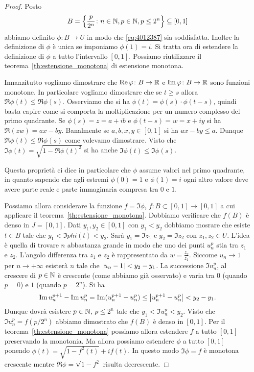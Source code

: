 \begin{proof}
Posto 
\[
B = {\left\{ \frac{p}{2^n}\colon n\in {\mathbb N}, p\in {\mathbb N}, p\le 2^n \right\}} \subseteq [0,1]
\]
abbiamo definito $\phi\colon B\to U$ in modo che \eqref{eq:4012387}
sia soddisfatta. 
Inoltre la definizione di $\phi$ è unica se imponiamo  
$\phi(1)=i$.
Si tratta ora di estendere la definizione di $\phi$ a tutto 
l'intervallo $[0,1]$. 
Possiamo riutilizzare il teorema~\ref{th:estensione_monotona} di 
estensione monotona.

Innanzitutto vogliamo dimostrare che $\operatorname{Re} \varphi\colon B\to {\mathbb R}$ 
e $\operatorname{Im} \varphi\colon B\to {\mathbb R}$ sono funzioni monotone.
In particolare vogliamo dimostrare che se $t\ge s$ allora 
$\Re \phi(t) \le \Re \phi(s)$.
Osserviamo che si ha $\phi(t) = \phi(s)\cdot \phi(t-s)$, 
quindi basta capire come si comporta la moltiplicazione per un 
numero complesso del primo quadrante.
Se $\phi(s)=z=a+ib$ e $\phi(t-s)=w=x+iy$ si ha
$\Re (zw) = ax-by$. Banalmente se $a,b,x,y\in[0,1]$ si ha 
$ax-by \le a$. 
Dunque $\Re \phi(t)\le \Re \phi(s)$ come volevamo dimostrare.
Visto che $\Im \phi(t) = \sqrt{1-\Re \phi(t)^2}$ si ha
anche $\Im \phi(t) \le \Im \phi(s)$.

Questa proprietà ci dice in particolare che $\phi$ assume valori 
nel primo quadrante, in quanto sapendo che agli estremi 
$\phi(0) = 1$ 
e $\phi(1)=i$ ogni altro valore deve avere parte reale 
e parte immaginaria compresa tra $0$ e $1$.

Possiamo allora considerare la funzione 
$f=\Im \phi$, $f\colon B\subset [0,1]\to[0,1]$
a cui applicare il teorema~\ref{th:estensione_monotona}.
Dobbiamo verificare che $f(B)$ è denso in $J=[0,1]$. 
Dati $y_1,y_2\in [0,1]$ con $y_1<y_2$ dobbiamo mosrare che esiste $t\in B$ tale 
che $y_1 < \Im phi(t) < y_2$.
Sarà $y_1=\Im z_1$ e $y_2=\Im z_2$ con $z_1,z_2\in U$.
L'idea è quella di trovare $n$ abbastanza grande in modo che uno dei punti 
$u_n^p$ stia tra $z_1$ e $z_2$. 
L'angolo differenza tra $z_1$ e $z_2$ è rappresentato da 
$w=\frac{z_2}{z_1}$. 
Siccome $u_n\to 1$ per $n\to +\infty$ 
esisterà $n$ tale che ${\left|u_n-1\right|}<y_2-y_1$.
La successione $\Im u_n^p$, al crescere di $p\in {\mathbb N}$ è crescente 
(come abbiamo già osservato) e varia tra $0$ (quando $p=0$) e $1$ 
(quando $p=2^n$). 
Si ha
\[
 \operatorname{Im} u_n^{p+1} - \operatorname{Im} u_n^p = \operatorname{Im} (u_n^{p+1}-u_n^p) 
 \le {\left|u_n^{p+1}-u_n^p\right|} < y_2-y_1.
\]
Dunque dovrà esistere $p\in {\mathbb N}$, $p\le 2^n$ tale che 
$y_1 < \Im u_n^p <y_2$. 
Visto che $\Im u_n^p = f(p/2^n)$ abbiamo dimostrato 
che $f(B)$ è denso in $[0,1]$.
Per il teorema~\ref{th:estensione_monotona} possiamo allora estendere 
$f$ a tutto $[0,1]$ preservando la monotonia.
Ma allora possiamo estendere $\phi$ a tutto $[0,1]$ 
ponendo $\phi(t) = \sqrt{1-f^2(t)} + i f(t)$. 
In questo modo $\Im \phi = f$ è monotona crescente mentre 
$\Re \phi=\sqrt{1-f^2}$ risulta decrescente.


\end{proof}
